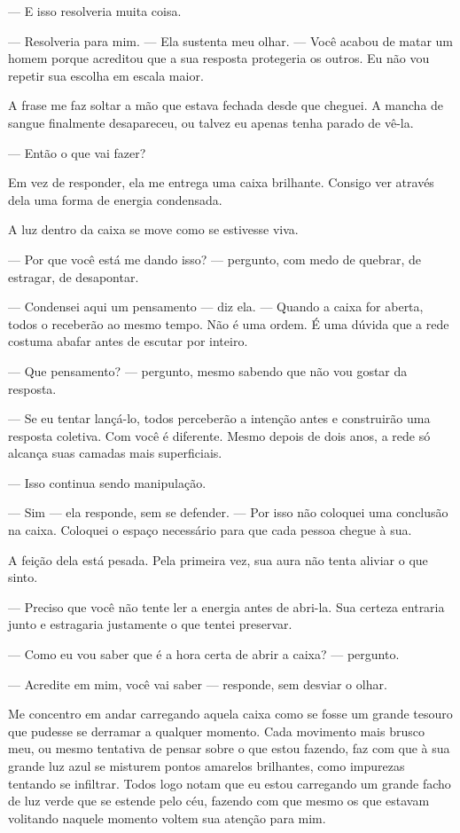 — E isso resolveria muita coisa.

— Resolveria para mim. — Ela sustenta meu olhar. — Você acabou de matar um homem porque acreditou que a sua resposta protegeria os outros. Eu não vou repetir sua escolha em escala maior.

A frase me faz soltar a mão que estava fechada desde que cheguei. A mancha de sangue finalmente desapareceu, ou talvez eu apenas tenha parado de vê-la.

— Então o que vai fazer?

Em vez de responder, ela me entrega uma caixa brilhante. Consigo ver através dela uma forma de energia condensada.

A luz dentro da caixa se move como se estivesse viva.

— Por que você está me dando isso? — pergunto, com medo de quebrar, de estragar, de desapontar.

— Condensei aqui um pensamento — diz ela. — Quando a caixa for aberta, todos o receberão ao mesmo tempo. Não é uma ordem. É uma dúvida que a rede costuma abafar antes de escutar por inteiro.

— Que pensamento? — pergunto, mesmo sabendo que não vou gostar da resposta.

— Se eu tentar lançá-lo, todos perceberão a intenção antes e construirão uma resposta coletiva. Com você é diferente. Mesmo depois de dois anos, a rede só alcança suas camadas mais superficiais.

— Isso continua sendo manipulação.

— Sim — ela responde, sem se defender. — Por isso não coloquei uma conclusão na caixa. Coloquei o espaço necessário para que cada pessoa chegue à sua.

A feição dela está pesada. Pela primeira vez, sua aura não tenta aliviar o que sinto.

— Preciso que você não tente ler a energia antes de abri-la. Sua certeza entraria junto e estragaria justamente o que tentei preservar.

— Como eu vou saber que é a hora certa de abrir a caixa? — pergunto.

— Acredite em mim, você vai saber — responde, sem desviar o olhar.

\bigskip

Me concentro em andar carregando aquela caixa como se fosse um grande tesouro que pudesse se derramar a qualquer momento. Cada movimento mais brusco meu, ou mesmo tentativa de pensar sobre o que estou fazendo, faz com que à sua grande luz azul se misturem pontos amarelos brilhantes, como impurezas tentando se infiltrar. Todos logo notam que eu estou carregando um grande facho de luz verde que se estende pelo céu, fazendo com que mesmo os que estavam volitando naquele momento voltem sua atenção para mim.

